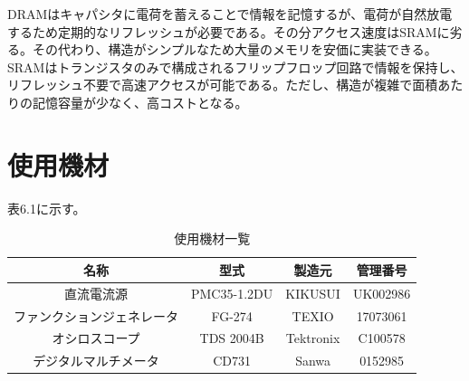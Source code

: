 \documentclass{jlreq}
\numberwithin{equation}{section}
\begin{document}
DRAMはキャパシタに電荷を蓄えることで情報を記憶するが、電荷が自然放電するため定期的なリフレッシュが必要である。その分アクセス速度はSRAMに劣る。その代わり、構造がシンプルなため大量のメモリを安価に実装できる。\\
SRAMはトランジスタのみで構成されるフリップフロップ回路で情報を保持し、リフレッシュ不要で高速アクセスが可能である。ただし、構造が複雑で面積あたりの記憶容量が少なく、高コストとなる。

\section{使用機材}
表6.1に示す。
\begin{table}[H]
  \centering
  \caption{使用機材一覧}
  \begin{tabular}{|c|c|c|c|}
    \hline
    名称 & 型式 & 製造元 & 管理番号 \\ \hline
    直流電流源 & PMC35-1.2DU & KIKUSUI & UK002986 \\ \hline
    ファンクションジェネレータ & FG-274 & TEXIO & 17073061 \\ \hline
    オシロスコープ & TDS 2004B & Tektronix & C100578 \\ \hline
    デジタルマルチメータ & CD731 & Sanwa & 0152985 \\ \hline
  \end{tabular}
\end{table}
\end{document}
